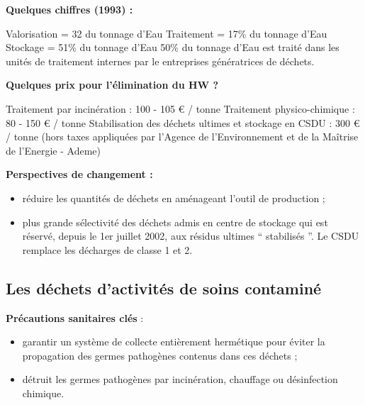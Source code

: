 \vspace {0.3cm}
\textbf{Quelques chiffres (1993) :}
\vspace{0.3cm}

Valorisation = 32 du tonnage d'Eau
Traitement = 17\% du tonnage d'Eau
Stockage = 51\% du tonnage d'Eau
50\% du tonnage d'Eau est traité dans les unités de traitement internes par le entreprises génératrices de déchets.
\vspace{0.3cm}

\textbf{Quelques prix pour l'élimination du HW ?}
\vspace{0.3cm}

Traitement par incinération : 100 - 105 € / tonne
Traitement physico-chimique : 80 - 150 € / tonne
Stabilisation des déchets ultimes et stockage en CSDU : 300 € / tonne (hors taxes appliquées par l'Agence de l'Environnement et de la Maîtrise de l'Energie - Ademe)

\vspace {0.3cm}
\textbf{Perspectives de changement :}
\vspace{0.3cm}

\begin{itemize}
\item réduire les quantités de déchets en aménageant l’outil de production ;
\item plus grande sélectivité des déchets admis en centre de stockage qui est réservé, depuis le 1er juillet 2002, aux résidus ultimes “ stabilisés ”. Le CSDU remplace les décharges de classe 1 et 2.
\end{itemize}

\subsection{Les déchets d’activités de soins contaminé}

\vspace{0.3cm}
\textbf{Précautions sanitaires clés} :
\vspace{0.3cm}

\begin{itemize}
\item garantir un système de collecte entièrement hermétique pour éviter la propagation des germes pathogènes contenus dans ces déchets ;
\item détruit les germes pathogènes par incinération, chauffage ou désinfection chimique.
\end{itemize}

